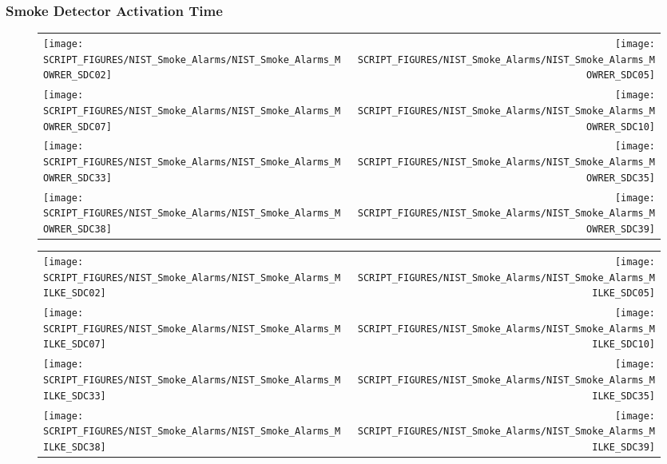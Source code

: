 \clearpage

\subsubsection{Smoke Detector Activation Time}

\begin{figure}[p]
\begin{tabular*}{\textwidth}{l@{\extracolsep{\fill}}r}
\texttt{[image: SCRIPT\_FIGURES/NIST\_Smoke\_Alarms/NIST\_Smoke\_Alarms\_MOWRER\_SDC02]} &
\texttt{[image: SCRIPT\_FIGURES/NIST\_Smoke\_Alarms/NIST\_Smoke\_Alarms\_MOWRER\_SDC05]} \\
\texttt{[image: SCRIPT\_FIGURES/NIST\_Smoke\_Alarms/NIST\_Smoke\_Alarms\_MOWRER\_SDC07]} &
\texttt{[image: SCRIPT\_FIGURES/NIST\_Smoke\_Alarms/NIST\_Smoke\_Alarms\_MOWRER\_SDC10]} \\
\texttt{[image: SCRIPT\_FIGURES/NIST\_Smoke\_Alarms/NIST\_Smoke\_Alarms\_MOWRER\_SDC33]} &
\texttt{[image: SCRIPT\_FIGURES/NIST\_Smoke\_Alarms/NIST\_Smoke\_Alarms\_MOWRER\_SDC35]} \\
\texttt{[image: SCRIPT\_FIGURES/NIST\_Smoke\_Alarms/NIST\_Smoke\_Alarms\_MOWRER\_SDC38]} &
\texttt{[image: SCRIPT\_FIGURES/NIST\_Smoke\_Alarms/NIST\_Smoke\_Alarms\_MOWRER\_SDC39]}
\end{tabular*}
\end{figure}

\begin{figure}[p]
\begin{tabular*}{\textwidth}{l@{\extracolsep{\fill}}r}
\texttt{[image: SCRIPT\_FIGURES/NIST\_Smoke\_Alarms/NIST\_Smoke\_Alarms\_MILKE\_SDC02]} &
\texttt{[image: SCRIPT\_FIGURES/NIST\_Smoke\_Alarms/NIST\_Smoke\_Alarms\_MILKE\_SDC05]} \\
\texttt{[image: SCRIPT\_FIGURES/NIST\_Smoke\_Alarms/NIST\_Smoke\_Alarms\_MILKE\_SDC07]} &
\texttt{[image: SCRIPT\_FIGURES/NIST\_Smoke\_Alarms/NIST\_Smoke\_Alarms\_MILKE\_SDC10]} \\
\texttt{[image: SCRIPT\_FIGURES/NIST\_Smoke\_Alarms/NIST\_Smoke\_Alarms\_MILKE\_SDC33]} &
\texttt{[image: SCRIPT\_FIGURES/NIST\_Smoke\_Alarms/NIST\_Smoke\_Alarms\_MILKE\_SDC35]} \\
\texttt{[image: SCRIPT\_FIGURES/NIST\_Smoke\_Alarms/NIST\_Smoke\_Alarms\_MILKE\_SDC38]} &
\texttt{[image: SCRIPT\_FIGURES/NIST\_Smoke\_Alarms/NIST\_Smoke\_Alarms\_MILKE\_SDC39]}
\end{tabular*}
\end{figure}

